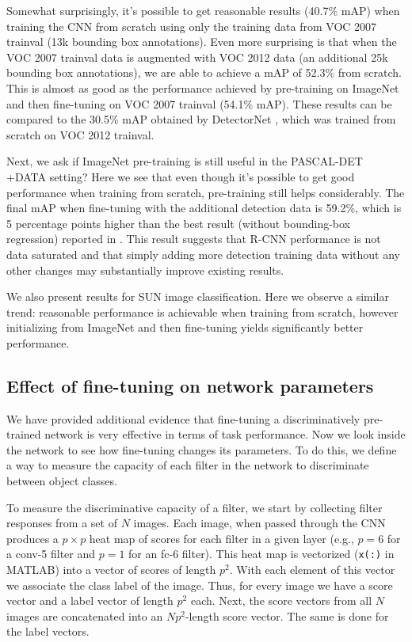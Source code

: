 Somewhat surprisingly, it's possible to get reasonable results (40.7\% mAP) when training the CNN from scratch using only the training data from VOC 2007 trainval (13k bounding box annotations).
Even more surprising is that when the VOC 2007 trainval data is augmented with VOC 2012 data (an additional 25k bounding box annotations), we are able to achieve a mAP of 52.3\% from scratch.
This is almost as good as the performance achieved by pre-training on ImageNet and then fine-tuning on VOC 2007 trainval (54.1\% mAP).
These results can be compared to the 30.5\% mAP obtained by DetectorNet \cite{DetectorNet}, which was trained from scratch on VOC 2012 trainval.

Next, we ask if ImageNet pre-training is still useful in the PASCAL-DET +DATA setting?
Here we see that even though it's possible to get good performance when training from scratch, pre-training still helps considerably.
The final mAP when fine-tuning with the additional detection data is 59.2\%, which is 5 percentage points higher than the best result (without bounding-box regression) reported in \cite{Rcnn}.
This result suggests that R-CNN performance is not data saturated and that simply adding more detection training data without any other changes may substantially improve existing results.

We also present results for SUN image classification.
Here we observe a similar trend: reasonable performance is achievable when training from scratch, however initializing from ImageNet and then fine-tuning yields significantly better performance.

\subsection{Effect of fine-tuning on network parameters}
\label{sub:fine-entropy}
We have provided additional evidence that fine-tuning a discriminatively pre-trained network is very effective in terms of task performance.
Now we look inside the network to see how fine-tuning changes its parameters.
To do this, we define a way to measure the capacity of each filter in the network to discriminate between object classes.

To measure the discriminative capacity of a filter, we start by collecting filter responses from a set of $N$ images.
Each image, when passed through the CNN produces a $p \times p$ heat map of scores for each filter in a given layer (e.g., $p = 6$ for a conv-5 filter and $p = 1$ for an fc-6 filter).
This heat map is vectorized (\texttt{x(:)} in MATLAB) into a vector of scores of length $p^2$. With each element of this vector we associate the class label of the image. 
Thus, for every image we have a score vector and a label vector of length $p^2$ each.
Next, the score vectors from all $N$ images are concatenated into an $Np^2$-length score vector.
The same is done for the label vectors.

